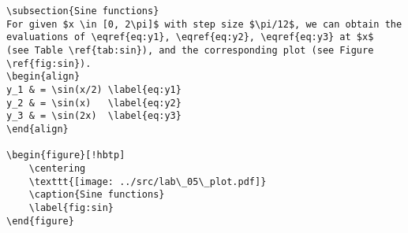 \begin{verbatim}
\subsection{Sine functions}
For given $x \in [0, 2\pi]$ with step size $\pi/12$, we can obtain the
evaluations of \eqref{eq:y1}, \eqref{eq:y2}, \eqref{eq:y3} at $x$
(see Table \ref{tab:sin}), and the corresponding plot (see Figure \ref{fig:sin}).
\begin{align}
y_1 & = \sin(x/2) \label{eq:y1}
y_2 & = \sin(x)   \label{eq:y2}
y_3 & = \sin(2x)  \label{eq:y3}
\end{align}

\begin{figure}[!hbtp]
    \centering
    \texttt{[image: ../src/lab\_05\_plot.pdf]}
    \caption{Sine functions}
    \label{fig:sin}
\end{figure}
\end{verbatim}
